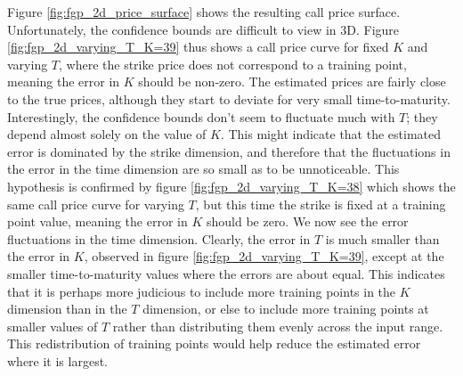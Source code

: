 \documentclass[a4paper,12pt]{article}
\begin{document}
\noindent Figure \ref{fig:fgp_2d_price_surface} shows the resulting call price surface. Unfortunately, the confidence bounds are difficult to view in 3D. Figure \ref{fig:fgp_2d_varying_T_K=39} thus shows a call price curve for fixed $K$ and varying $T$, where the strike price does not correspond to a training point, meaning the error in $K$ should be non-zero. The estimated prices are fairly close to the true prices, although they start to deviate for very small time-to-maturity. Interestingly, the confidence bounds don't seem to fluctuate much with $T$; they depend almost solely on the value of $K$. This might indicate that the estimated error is dominated by the strike dimension, and therefore that the fluctuations in the error in the time dimension are so small as to be unnoticeable. This hypothesis is confirmed by figure \ref{fig:fgp_2d_varying_T_K=38} which shows the same call price curve for varying $T$, but this time the strike is fixed at a training point value, meaning the error in $K$ should be zero. We now see the error fluctuations in the time dimension. Clearly, the error in $T$ is much smaller than the error in $K$, observed in figure \ref{fig:fgp_2d_varying_T_K=39}, except at the smaller time-to-maturity values where the errors are about equal. This indicates that it is perhaps more judicious to include more training points in the $K$ dimension than in the $T$ dimension, or else to include more training points at smaller values of $T$ rather than distributing them evenly across the input range. This redistribution of training points would help reduce the estimated error where it is largest.\\
\end{document}
